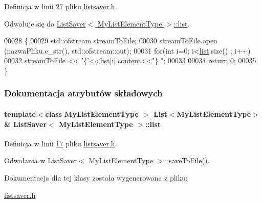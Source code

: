 Definicja w linii \hyperlink{listsaver_8h_source_l00027}{27} pliku \hyperlink{listsaver_8h_source}{listsaver.\-h}.



Odwołuje się do \hyperlink{listsaver_8h_source_l00017}{List\-Saver$<$ My\-List\-Element\-Type $>$\-::list}.


\begin{DoxyCode}
00028         \{
00029                 std::ofstream streamToFile;
00030                 streamToFile.open (nazwaPliku.c\_str(), std::ofstream::out);
00031                 \textcolor{keywordflow}{for}(\textcolor{keywordtype}{int} i=0; i<\hyperlink{class_list_saver_ac803162ee7ee2580226d530f89683ecb}{list}.size() ; i++)
00032                         streamToFile << \textcolor{charliteral}{'\{'}<<\hyperlink{class_list_saver_ac803162ee7ee2580226d530f89683ecb}{list}[i].content<<\textcolor{stringliteral}{"\} "};
00033 
00034                 \textcolor{keywordflow}{return} 0;
00035         \}
\end{DoxyCode}


\subsubsection{Dokumentacja atrybutów składowych}
\hypertarget{class_list_saver_ac803162ee7ee2580226d530f89683ecb}{
\paragraph[{list}]{\setlength{\rightskip}{0pt plus 5cm}template$<$class My\-List\-Element\-Type $>$ {\bf List}$<$My\-List\-Element\-Type$>$\& {\bf List\-Saver}$<$ My\-List\-Element\-Type $>$\-::list\hspace{0.3cm}{\ttfamily [private]}}}\label{class_list_saver_ac803162ee7ee2580226d530f89683ecb}


Definicja w linii \hyperlink{listsaver_8h_source_l00017}{17} pliku \hyperlink{listsaver_8h_source}{listsaver.\-h}.



Odwołania w \hyperlink{listsaver_8h_source_l00027}{List\-Saver$<$ My\-List\-Element\-Type $>$\-::save\-To\-File()}.



Dokumentacja dla tej klasy została wygenerowana z pliku\-:\begin{DoxyCompactItemize}
\item 
\hyperlink{listsaver_8h}{listsaver.\-h}\end{DoxyCompactItemize}
